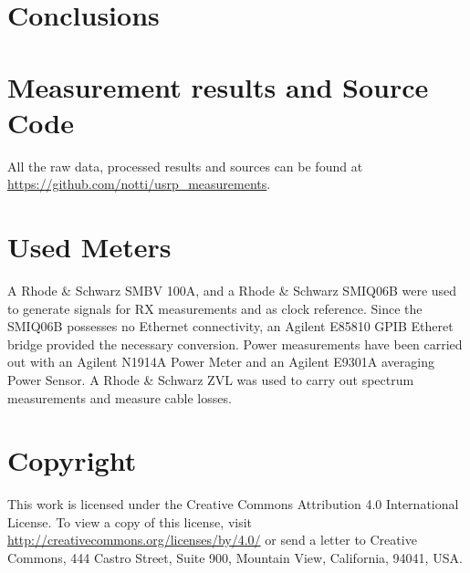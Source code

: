 \documentclass[12pt,a4paper,parskip=full,abstracton]{scrartcl}
\begin{document}
\section{Conclusions}
\clearpage
\begin{appendix}
\section{Measurement results and Source Code}
\label{sec:sources}
All the raw data, processed results and sources can be found at
\url{https://github.com/notti/usrp_measurements}.
\section{Used Meters}
\label{sec:meters}
A Rhode \& Schwarz SMBV 100A, and a Rhode \& Schwarz SMIQ06B were used to generate
signals for RX measurements and as clock reference. Since the SMIQ06B possesses no
Ethernet connectivity, an Agilent E85810 GPIB Etheret bridge provided the necessary
conversion. Power measurements have been carried out with an Agilent N1914A Power Meter and an
Agilent E9301A averaging Power Sensor. A Rhode \& Schwarz ZVL was used to carry out
spectrum measurements and measure cable losses.

\section*{Copyright}
This work is licensed under the Creative Commons Attribution 4.0 International
License. To view a copy of this license, visit
\url{http://creativecommons.org/licenses/by/4.0/} or send a letter to Creative
Commons, 444 Castro Street, Suite 900, Mountain View, California, 94041, USA.

\printglossary[type=\acronymtype]

\listoffigures



\end{appendix}
\end{document}
